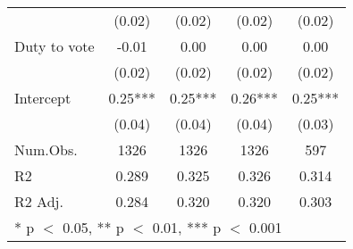 \begin{table}
\begin{tabular}[t]{lcccc}
 & (0.02) & (0.02) & (0.02) & \vphantom{1} (0.02)\\
Duty to vote & -0.01 & 0.00 & 0.00 & 0.00\\
 & (0.02) & (0.02) & (0.02) & (0.02)\\
Intercept & 0.25*** & 0.25*** & 0.26*** & 0.25***\\
 & (0.04) & (0.04) & (0.04) & (0.03)\\
\midrule
Num.Obs. & 1326 & 1326 & 1326 & 597\\
R2 & 0.289 & 0.325 & 0.326 & 0.314\\
R2 Adj. & 0.284 & 0.320 & 0.320 & 0.303\\
\bottomrule
\multicolumn{5}{l}{\rule{0pt}{1em}* p $<$ 0.05, ** p $<$ 0.01, *** p $<$ 0.001}\\
\end{tabular}
\end{table}
